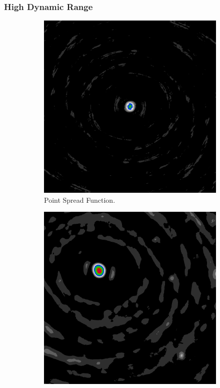 \subsubsection{High Dynamic Range}
\begin{figure}[h]
	\centering
	\begin{subfigure}[b]{0.3\linewidth}
		\includegraphics[width=\linewidth]{./chapters/01.intro/mk2/psf.png}
		\caption{Point Spread Function.}
		\label{results:points:tclean}
	\end{subfigure}
	\begin{subfigure}[b]{0.3\linewidth}
		\includegraphics[width=\linewidth]{./chapters/01.intro/mk2/dirty.png}

\end{subfigure}
\end{figure}
